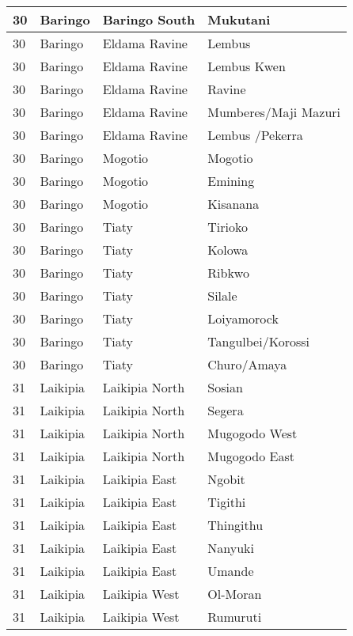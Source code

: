 \begin{table}[!ht]
\begin{tabular}{|l|l|l|l|}
        30 & Baringo & Baringo South & Mukutani \\ \hline
        30 & Baringo & Eldama Ravine & Lembus \\ \hline
        30 & Baringo & Eldama Ravine & Lembus Kwen \\ \hline
        30 & Baringo & Eldama Ravine & Ravine \\ \hline
        30 & Baringo & Eldama Ravine & Mumberes/Maji Mazuri \\ \hline
        30 & Baringo & Eldama Ravine & Lembus /Pekerra \\ \hline
        30 & Baringo & Mogotio & Mogotio \\ \hline
        30 & Baringo & Mogotio & Emining \\ \hline
        30 & Baringo & Mogotio & Kisanana \\ \hline
        30 & Baringo & Tiaty & Tirioko \\ \hline
        30 & Baringo & Tiaty & Kolowa \\ \hline
        30 & Baringo & Tiaty & Ribkwo \\ \hline
        30 & Baringo & Tiaty & Silale \\ \hline
        30 & Baringo & Tiaty & Loiyamorock \\ \hline
        30 & Baringo & Tiaty & Tangulbei/Korossi \\ \hline
        30 & Baringo & Tiaty & Churo/Amaya \\ \hline
        31 & Laikipia & Laikipia North & Sosian \\ \hline
        31 & Laikipia & Laikipia North & Segera \\ \hline
        31 & Laikipia & Laikipia North & Mugogodo West \\ \hline
        31 & Laikipia & Laikipia North & Mugogodo East \\ \hline
        31 & Laikipia & Laikipia East & Ngobit \\ \hline
        31 & Laikipia & Laikipia East & Tigithi \\ \hline
        31 & Laikipia & Laikipia East & Thingithu \\ \hline
        31 & Laikipia & Laikipia East & Nanyuki \\ \hline
        31 & Laikipia & Laikipia East &  Umande \\ \hline
        31 & Laikipia & Laikipia West & Ol-Moran \\ \hline
        31 & Laikipia & Laikipia West & Rumuruti \\ \hline

\end{tabular}
\end{table}
